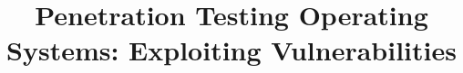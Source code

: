 \documentclass[manuscript,acmsmall,anonymous,review,screen,nonacm=true, authorversion=true]{acmart}
\begin{document}
\title{Penetration Testing Operating Systems: Exploiting Vulnerabilities}









\renewcommand{\shortauthors}{Trovato and Tobin, et al.}
\end{document}
